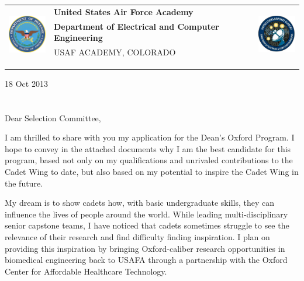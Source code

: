 \documentclass{article}
\begin{document}
	\noindent \begin{tabu} to \textwidth{l X[c] r}
	 & 
	\textbf{United States Air Force Academy} &  
	\\
	& \textbf{Department of Electrical and Computer Engineering} & \\
	& \tiny{USAF ACADEMY, COLORADO}\\
	\\ \\ \\
	\end{tabu}

	\hfill18 Oct 2013
	\hspace{0pt} \\
	\hspace{0pt} \\
	\hspace{0pt} \\

\noindent Dear Selection Committee,


I am thrilled to share with you my application for the Dean's Oxford Program.
I hope to convey in the attached documents why I am the best candidate for this program, based
not only on my qualifications and unrivaled contributions to the Cadet Wing to date, but also
based on my potential to inspire the Cadet Wing in the future. 

My dream is to show cadets how, with basic undergraduate skills, they can influence the lives of
people around the world. While leading multi-disciplinary senior capstone teams, 
I have noticed that cadets sometimes struggle to see the relevance of their research and find
difficulty finding inspiration. I plan on providing this inspiration by bringing
Oxford-caliber research opportunities in biomedical engineering back to USAFA through a 
partnership with the Oxford Center for Affordable Healthcare Technology.
\end{document}
